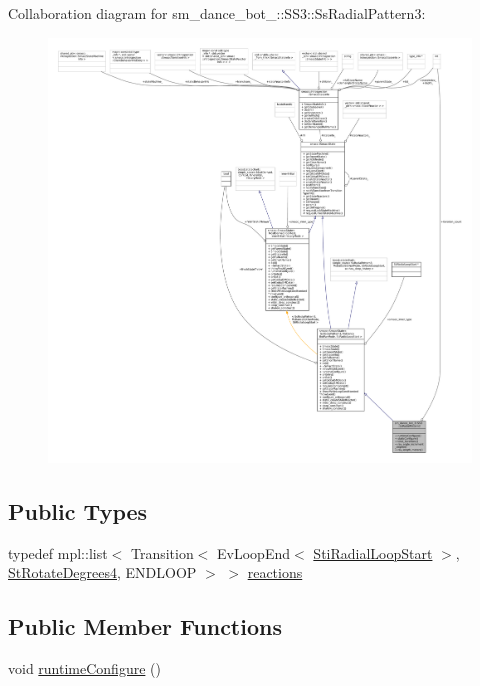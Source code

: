 Collaboration diagram for sm\+\_\+dance\+\_\+bot\+\_\+:\+:S\+S3\+:\+:Ss\+Radial\+Pattern3\+:
\nopagebreak
\begin{figure}[H]
\begin{center}
\leavevmode
\includegraphics[width=350pt]{structsm__dance__bot__3_1_1SS3_1_1SsRadialPattern3__coll__graph}
\end{center}
\end{figure}
\subsection*{Public Types}
\begin{DoxyCompactItemize}
\item 
typedef mpl\+::list$<$ Transition$<$ Ev\+Loop\+End$<$ \hyperlink{structsm__dance__bot__3_1_1radial__motion__states_1_1StiRadialLoopStart}{Sti\+Radial\+Loop\+Start} $>$, \hyperlink{structsm__dance__bot__3_1_1StRotateDegrees4}{St\+Rotate\+Degrees4}, E\+N\+D\+L\+O\+OP $>$ $>$ \hyperlink{structsm__dance__bot__3_1_1SS3_1_1SsRadialPattern3_a873da3cae48e32c03b8035d1a970013d}{reactions}
\end{DoxyCompactItemize}
\subsection*{Public Member Functions}
\begin{DoxyCompactItemize}
\item 
void \hyperlink{structsm__dance__bot__3_1_1SS3_1_1SsRadialPattern3_ad0c0e60a26e65b0d182e63f121dd94c3}{runtime\+Configure} ()
\end{DoxyCompactItemize}
